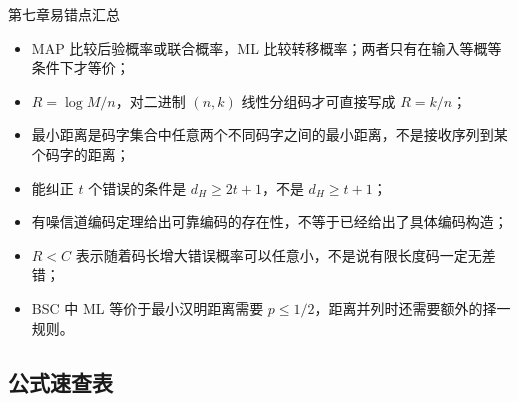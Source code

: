 \begin{warningBox}{第七章易错点汇总}
\begin{itemize}
  \item MAP 比较后验概率或联合概率，ML 比较转移概率；两者只有在输入等概等条件下才等价；
  \item $R=\log M/n$，对二进制 $(n,k)$ 线性分组码才可直接写成 $R=k/n$；
  \item 最小距离是码字集合中任意两个不同码字之间的最小距离，不是接收序列到某个码字的距离；
  \item 能纠正 $t$ 个错误的条件是 $d_H\ge2t+1$，不是 $d_H\ge t+1$；
  \item 有噪信道编码定理给出可靠编码的存在性，不等于已经给出了具体编码构造；
  \item $R<C$ 表示随着码长增大错误概率可以任意小，不是说有限长度码一定无差错；
  \item BSC 中 ML 等价于最小汉明距离需要 $p\le1/2$，距离并列时还需要额外的择一规则。
\end{itemize}
\end{warningBox}

\subsection{公式速查表}

